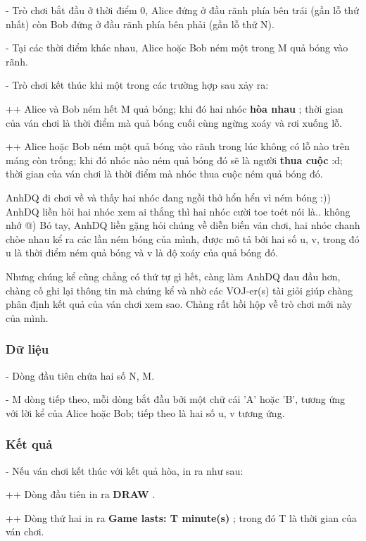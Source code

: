    - Trò chơi bắt đầu ở thời điểm 0, Alice đứng ở đầu rãnh phía bên trái (gần lỗ thứ nhất) còn Bob đứng ở đầu rãnh phía bên phải (gần lỗ thứ N).   


   - Tại các thời điểm khác nhau, Alice hoặc Bob ném một trong M quả bóng vào rãnh.   


   - Trò chơi kết thúc khi một trong các trường hợp sau xảy ra:   


   ++ Alice và Bob ném hết M quả bóng; khi đó hai nhóc   \textbf{    hòa nhau   }   ; thời gian của ván chơi là thời điểm mà quả bóng cuối cùng ngừng xoáy và rơi xuống lỗ.   


   ++ Alice hoặc Bob ném một quả bóng vào rãnh trong lúc không có lỗ nào trên máng còn trống; khi đó nhóc nào ném quả bóng đó sẽ là người   \textbf{    thua cuộc   }   :d; thời gian của ván chơi là thời điểm mà nhóc thua cuộc ném quả bóng đó.  

   AnhDQ đi chơi về và thấy hai nhóc đang ngồi thở hổn hển vì ném bóng :)) AnhDQ liền hỏi hai nhóc xem ai thắng thì hai nhóc cười toe toét nói là.. không nhớ @) Bó tay, AnhDQ liền gặng hỏi chúng về diễn biến ván chơi, hai nhóc chanh chòe nhau kể ra các lần ném bóng của mình, được mô tả bởi hai số u, v, trong đó u là thời điểm ném quả bóng và v là độ xoáy của quả bóng đó.  

   Nhưng chúng kể cũng chẳng có thứ tự gì hết, càng làm AnhDQ đau đầu hơn, chàng cố ghi lại thông tin mà chúng kể và nhờ các VOJ-er(s) tài giỏi giúp chàng phân định kết quả của ván chơi xem sao. Chàng rất hồi hộp về trò chơi mới này của mình.  

\subsubsection{   Dữ liệu  }

   - Dòng đầu tiên chứa hai số N, M.   


   - M dòng tiếp theo, mỗi dòng bắt đầu bởi một chữ cái 'A' hoặc 'B', tương ứng với lời kể của Alice hoặc Bob; tiếp theo là hai số u, v tương ứng.  

\subsubsection{   Kết quả  }

   - Nếu ván chơi kết thúc với kết quả hòa, in ra như sau:   


   ++ Dòng đầu tiên in ra   \textbf{    DRAW   }   .   


   ++ Dòng thứ hai in ra   \textbf{    Game lasts: T minute(s)   }   ; trong đó T là thời gian của ván chơi.   


